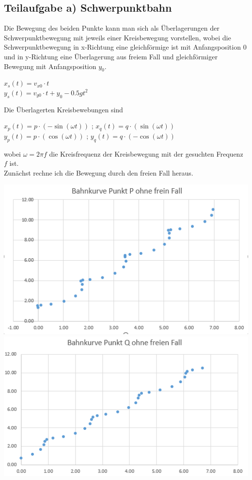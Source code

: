 \documentclass{article}
\begin{document}
\subsection*{Teilaufgabe a) Schwerpunktbahn}
Die Bewegung des beiden Punkte kann man sich als Überlagerungen der Schwerpunktbewegung mit jeweils einer Kreisbewegung vorstellen, wobei die Schwerpunktbewegung in x-Richtung eine gleichförmige ist mit 
Anfangsposition 0 und in y-Richtung eine Überlagerung aus freiem Fall und gleichförmiger Bewegung mit Anfangsposition $y_0$.
\begin{center}
	$x_s (t)= v_{x0}\cdot t$ \\
	$y_s (t) = v_{y0}\cdot t + y_0 -0.5 g t^2$
\end{center}   
Die Überlagerten Kreisbewebungen sind
\begin{center}
	$x_p (t) = p \cdot (-\sin(\omega t))$ ; $x_q (t)= q \cdot (\sin(\omega t)) $\\
	$y_p (t) = p \cdot (\cos(\omega t))$ ; $y_q (t)= q \cdot (-\cos(\omega t)) $
\end{center} 
wobei $\omega = 2\pi f $ die Kreisfrequenz der Kreisbewegung mit der gesuchten Frequenz $f$ ist.\\
Zunächst rechne ich die Bewegung durch den freien Fall heraus.  
\begin{center}
	\includegraphics[scale=0.6]{Kurve-P-Punkt-ohne-freien-Fall.png}
	\includegraphics[scale=0.6]{Kurve-Q-Punkt-ohne-freien-Fall.png}
\end{center}
\end{document}
